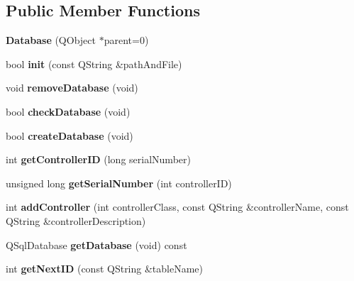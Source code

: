 \subsection*{Public Member Functions}
\begin{DoxyCompactItemize}
\item 
\mbox{\label{class_database_a1eb00cb7d192abcfa766f6228492ff23}} 
{\bfseries Database} (Q\+Object $\ast$parent=0)
\item 
\mbox{\label{class_database_aa2c92e707d102550af16c8dca42815ac}} 
bool {\bfseries init} (const Q\+String \&path\+And\+File)
\item 
\mbox{\label{class_database_a53105764e2c9c0992e0e95022046288f}} 
void {\bfseries remove\+Database} (void)
\item 
\mbox{\label{class_database_aff7b80a2cf6743c0a57f63d9bfed641b}} 
bool {\bfseries check\+Database} (void)
\item 
\mbox{\label{class_database_ab916411c9403523dd709de378026754d}} 
bool {\bfseries create\+Database} (void)
\item 
\mbox{\label{class_database_a4eaffbc1571e91a8adb40cfe076069c5}} 
int {\bfseries get\+Controller\+ID} (long serial\+Number)
\item 
\mbox{\label{class_database_a49c87a6a938b5b0027cb3d7e95a2fdd8}} 
unsigned long {\bfseries get\+Serial\+Number} (int controller\+ID)
\item 
\mbox{\label{class_database_aebd4c272f7a8331f46c57105aae3cf31}} 
int {\bfseries add\+Controller} (int controller\+Class, const Q\+String \&controller\+Name, const Q\+String \&controller\+Description)
\item 
\mbox{\label{class_database_ad022e230c02d99968e1b521c24548269}} 
Q\+Sql\+Database {\bfseries get\+Database} (void) const
\item 
\mbox{\label{class_database_a1c19214e960ef7e6e06cf8bc8a96dd13}} 
int {\bfseries get\+Next\+ID} (const Q\+String \&table\+Name)

\end{DoxyCompactItemize}
